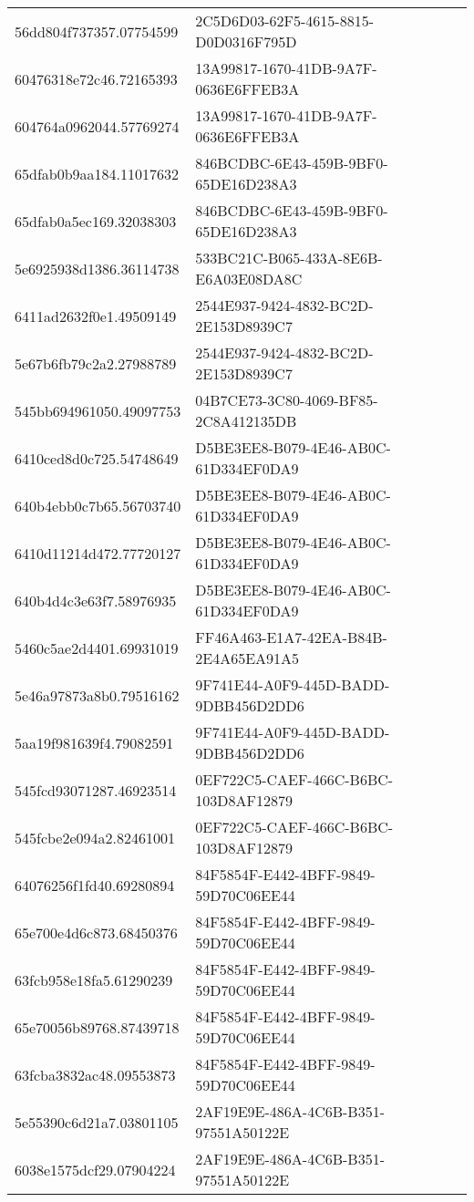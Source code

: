 \begin{tabular}{ll}
56dd804f737357.07754599 & 2C5D6D03-62F5-4615-8815-D0D0316F795D \\
60476318e72c46.72165393 & 13A99817-1670-41DB-9A7F-0636E6FFEB3A \\
604764a0962044.57769274 & 13A99817-1670-41DB-9A7F-0636E6FFEB3A \\
65dfab0b9aa184.11017632 & 846BCDBC-6E43-459B-9BF0-65DE16D238A3 \\
65dfab0a5ec169.32038303 & 846BCDBC-6E43-459B-9BF0-65DE16D238A3 \\
5e6925938d1386.36114738 & 533BC21C-B065-433A-8E6B-E6A03E08DA8C \\
6411ad2632f0e1.49509149 & 2544E937-9424-4832-BC2D-2E153D8939C7 \\
5e67b6fb79c2a2.27988789 & 2544E937-9424-4832-BC2D-2E153D8939C7 \\
545bb694961050.49097753 & 04B7CE73-3C80-4069-BF85-2C8A412135DB \\
6410ced8d0c725.54748649 & D5BE3EE8-B079-4E46-AB0C-61D334EF0DA9 \\
640b4ebb0c7b65.56703740 & D5BE3EE8-B079-4E46-AB0C-61D334EF0DA9 \\
6410d11214d472.77720127 & D5BE3EE8-B079-4E46-AB0C-61D334EF0DA9 \\
640b4d4c3e63f7.58976935 & D5BE3EE8-B079-4E46-AB0C-61D334EF0DA9 \\
5460c5ae2d4401.69931019 & FF46A463-E1A7-42EA-B84B-2E4A65EA91A5 \\
5e46a97873a8b0.79516162 & 9F741E44-A0F9-445D-BADD-9DBB456D2DD6 \\
5aa19f981639f4.79082591 & 9F741E44-A0F9-445D-BADD-9DBB456D2DD6 \\
545fcd93071287.46923514 & 0EF722C5-CAEF-466C-B6BC-103D8AF12879 \\
545fcbe2e094a2.82461001 & 0EF722C5-CAEF-466C-B6BC-103D8AF12879 \\
64076256f1fd40.69280894 & 84F5854F-E442-4BFF-9849-59D70C06EE44 \\
65e700e4d6c873.68450376 & 84F5854F-E442-4BFF-9849-59D70C06EE44 \\
63fcb958e18fa5.61290239 & 84F5854F-E442-4BFF-9849-59D70C06EE44 \\
65e70056b89768.87439718 & 84F5854F-E442-4BFF-9849-59D70C06EE44 \\
63fcba3832ac48.09553873 & 84F5854F-E442-4BFF-9849-59D70C06EE44 \\
5e55390c6d21a7.03801105 & 2AF19E9E-486A-4C6B-B351-97551A50122E \\
6038e1575dcf29.07904224 & 2AF19E9E-486A-4C6B-B351-97551A50122E \\

\end{tabular}
